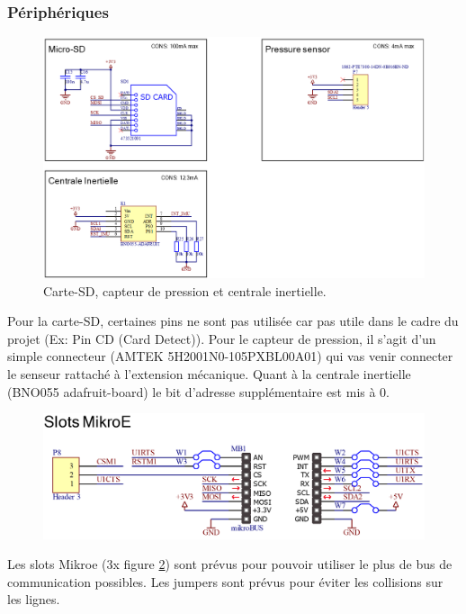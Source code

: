 {	\clearpage
	\subsubsection{Périphériques}
	{
		\begin{figure}[h]
			\centering
			\includegraphics[width=0.85\linewidth]{Figures/Dev-SCH/Periph1}
			\caption{Carte-SD, capteur de pression et centrale inertielle.}
			\label{fig:periph1}
		\end{figure}
		
		Pour la carte-SD, certaines pins ne sont pas utilisée car pas utile dans le cadre du projet (Ex: Pin CD (Card Detect)).
		Pour le capteur de pression, il s'agit d'un simple connecteur (AMTEK 5H2001N0-105PXBL00A01) qui vas venir connecter le senseur rattaché à l'extension mécanique.
		Quant à la centrale inertielle (BNO055 adafruit-board) le bit d'adresse supplémentaire est mis à 0.
		
		\begin{figure}[h]
			\centering
			\includegraphics[width=0.8\linewidth]{Figures/Dev-SCH/Mikroe}
			\caption{}
			\label{fig:mikroe}
		\end{figure}
		Les slots Mikroe (3x figure \ref{fig:mikroe}) sont prévus pour pouvoir utiliser le plus de bus de communication possibles. Les jumpers sont prévus pour éviter les collisions sur les lignes.
		
	}

	\clearpage
}
